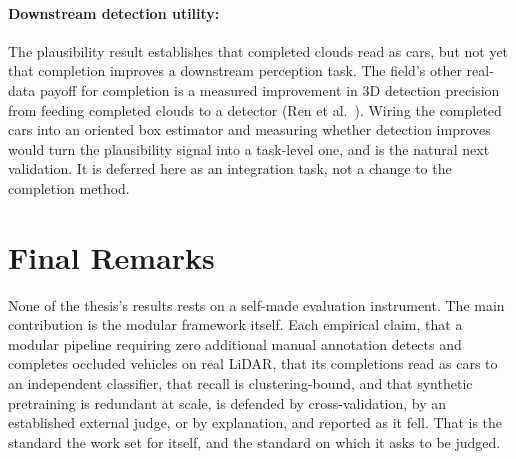 \paragraph{Downstream detection utility:} The plausibility result establishes that completed
clouds read as cars, but not yet that completion improves a downstream perception task. The
field's other real-data payoff for completion is a measured improvement in 3D detection
precision from feeding completed clouds to a detector (Ren et
al.~\cite{ren2022selfsupervised}). Wiring the completed cars into an oriented box estimator
and measuring whether detection improves would turn the plausibility signal into a
task-level one, and is the natural next validation. It is deferred here as an integration
task, not a change to the completion method.

\section*{Final Remarks}

None of the thesis's results rests on a self-made evaluation instrument. The main
contribution is the modular framework itself. Each empirical claim, that a modular
pipeline requiring zero additional manual annotation detects and completes occluded vehicles
on real LiDAR, that its
completions read as cars to an independent classifier, that recall is clustering-bound, and that
synthetic pretraining is redundant at scale, is defended by cross-validation, by an
established external judge, or by explanation, and reported as it fell. That is the standard
the work set for itself, and the standard on which it asks to be judged.
